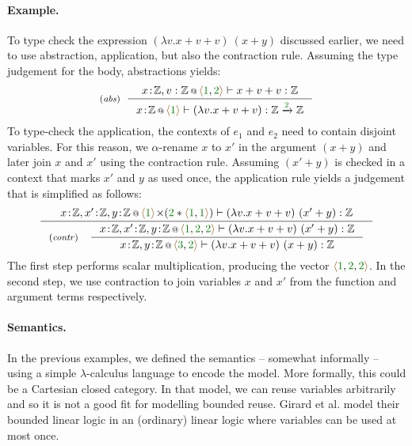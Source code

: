 \paragraph{Example.} To type check the expression $(\lambda v.x+v+v)~(x+y)$ discussed earlier, we need
to use abstraction, application, but also the contraction rule. Assuming the type judgement for the body,
abstractions yields:
%
\begin{equation*}
\tyrule{abs}
 { \coctx{x\!:\!\mathbb{Z},v:\mathbb{Z}}{\alift{\cclrd{1},\cclrd{2}}} \vdash x+v+v : \mathbb{Z} }
 { \coctx{x\!:\!\mathbb{Z}}{\alift{\cclrd{1}}} \vdash (\lambda v.x+v+v) : \mathbb{Z} \xrightarrow{\cclrd{2}} \mathbb{Z} }
\end{equation*}
%
To type-check the application, the contexts of $e_1$ and $e_2$ need to contain disjoint variables.
For this reason, we $\alpha$-rename $x$ to $x'$ in the argument $(x+y)$ and later join $x$ and $x'$ using
the contraction rule. Assuming $(x'+y)$ is checked in a context that marks $x'$ and $y$ as used once, the 
application rule yields a judgement that is simplified as follows:
%
\begin{equation*}
\inference
  { \coctx{x\!:\!\mathbb{Z},x'\!:\!\mathbb{Z},y\!:\!\mathbb{Z}}
          {\alift{\cclrd{1}} \cons (\cclrd{2} \ast \alift{\cclrd{1},\cclrd{1}}) } \vdash (\lambda v.x+v+v)~(x'+y) : \mathbb{Z} }
{\tyrule{contr}
  { \coctx{x\!:\!\mathbb{Z},x'\!:\!\mathbb{Z},y\!:\!\mathbb{Z}}{\alift{\cclrd{1}, \cclrd{2}, \cclrd{2}} } \vdash (\lambda v.x+v+v)~(x'+y) : \mathbb{Z} }
  { \coctx{x\!:\!\mathbb{Z},y\!:\!\mathbb{Z}}{\alift{\cclrd{3}, \cclrd{2}}} \vdash (\lambda v.x+v+v)~(x+y)  : \mathbb{Z}} }
\end{equation*}
%
The first step performs scalar multiplication, producing the vector
$\alift{\cclrd{1},\cclrd{2},\cclrd{2}}$. In the second step, we use contraction to join variables 
$x$ and $x'$ from the function and argument terms respectively.


\paragraph{Semantics.}
In the previous examples, we defined the semantics -- somewhat informally -- using a simple 
$\lambda$-calculus language to encode the model. More formally, this could be a Cartesian closed 
category. In that model, we can reuse variables arbitrarily and so it is not
a good fit for modelling bounded reuse. Girard et al. \cite{logic-bounded} model their bounded
linear logic in an (ordinary) linear logic where variables can be used at most once.

